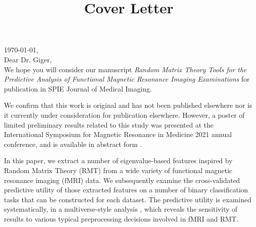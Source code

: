 \documentclass[10pt,letter]{article}
\begin{document}
% 
\thispagestyle{nofooter}  %
\setlength{\headheight}{30.0pt}
\normalsize

\title{Cover Letter}


\noindent
\today, \\
Dear Dr. Giger, \\

We hope you will consider our manuscript \emph{Random Matrix Theory Tools for
the Predictive Analysis of Functional Magnetic Resonance Imaging Examinations}
for publication in SPIE Journal of Medical Imaging.

We confirm that this work is original and has not been published elsewhere nor
is it currently under consideration for publication elsewhere. However, a
poster of limited preliminary results related to this study was presented at
the International Symposium for Magnetic Resonance in Medicine 2021 annual
conference, and is available in abstract form \citep{bergerOpenSourceRandom2021}.

In this paper, we extract a number of eigenvalue-based features inspired by
Random Matrix Theory (RMT) from a wide variety of functional magnetic resonance
imaging (fMRI) data. We subsequently examine the cross-validated predictive
utility of those extracted features on a number of binary classification tasks
that can be constructed for each dataset. The predictive utility is examined
systematically, in a  multiverse-style analysis
\citep{steegenIncreasingTransparencyMultiverse2016}, which reveals the
sensitivity of results to various typical preprocessing decisions involved in
fMRI and RMT.
\end{document}
